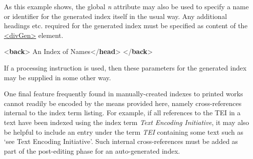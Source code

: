 As this example shows, the global {\itshape n} attribute may also be used to specify a name or identifier for the generated index itself in the usual way. Any additional headings etc. required for the generated index must be specified as content of the \hyperref[TEI.divGen]{<divGen>} element. \par\bgroup{}\exampleFont \begin{shaded}\noindent\mbox{}{<\textbf{back}>}\mbox{}\newline 
{}\mbox{}\newline 
\hspace*{1em}An Index of Names{</\textbf{head}>}\mbox{}\newline 
{}\mbox{}\newline 
{</\textbf{back}>}\end{shaded}\egroup\par \par
If a processing instruction is used, then these parameters for the generated index may be supplied in some other way.\par
One final feature frequently found in manually-created indexes to printed works cannot readily be encoded by the means provided here, namely cross-references internal to the index term listing. For example, if all references to the TEI in a text have been indexed using the index term \textit{Text Encoding Initiative}, it may also be helpful to include an entry under the term \textit{TEI} containing some text such as ‘see Text Encoding Initiative’. Such internal cross-references must be added as part of the post-editing phase for an auto-generated index.
